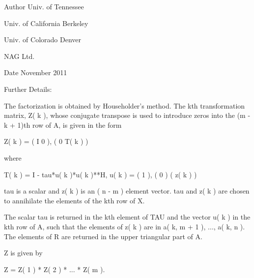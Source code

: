 \begin{DoxyAuthor}{Author}
Univ. of Tennessee 

Univ. of California Berkeley 

Univ. of Colorado Denver 

N\+A\+G Ltd. 
\end{DoxyAuthor}
\begin{DoxyDate}{Date}
November 2011 
\end{DoxyDate}
\begin{DoxyParagraph}{Further Details\+: }
\begin{DoxyVerb}  The  factorization is obtained by Householder's method.  The kth
  transformation matrix, Z( k ), whose conjugate transpose is used to
  introduce zeros into the (m - k + 1)th row of A, is given in the form

     Z( k ) = ( I     0   ),
              ( 0  T( k ) )

  where

     T( k ) = I - tau*u( k )*u( k )**H,   u( k ) = (   1    ),
                                                   (   0    )
                                                   ( z( k ) )

  tau is a scalar and z( k ) is an ( n - m ) element vector.
  tau and z( k ) are chosen to annihilate the elements of the kth row
  of X.

  The scalar tau is returned in the kth element of TAU and the vector
  u( k ) in the kth row of A, such that the elements of z( k ) are
  in  a( k, m + 1 ), ..., a( k, n ). The elements of R are returned in
  the upper triangular part of A.

  Z is given by

     Z =  Z( 1 ) * Z( 2 ) * ... * Z( m ).\end{DoxyVerb}
 
\end{DoxyParagraph}
